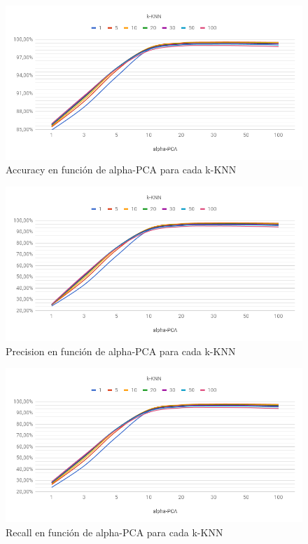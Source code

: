 \begin{figure}
    \centering
    \includegraphics[width=\textwidth]{graficos/cv1_accuracy.png}
    \caption{Accuracy en función de alpha-PCA para cada k-KNN}
    \label{fig:cv1_accuracy}
\end{figure}

\begin{figure}
    \centering
    \includegraphics[width=\textwidth]{graficos/cv1_precision.png}
    \caption{Precision en función de alpha-PCA para cada k-KNN}
    \label{fig:cv1_precision}
\end{figure}

\begin{figure}
    \centering
    \includegraphics[width=\textwidth]{graficos/cv1_recall.png}
    \caption{Recall en función de alpha-PCA para cada k-KNN}
    \label{fig:cv1_recall}
\end{figure}

